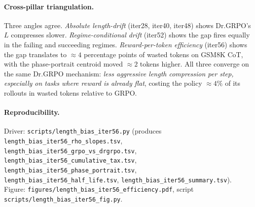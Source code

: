 \paragraph{Cross-pillar triangulation.}
Three angles agree. \emph{Absolute length-drift} (iter28, iter40, iter48)
shows Dr.GRPO's $L$ compresses slower. \emph{Regime-conditional drift}
(iter52) shows the gap fires equally in the failing and succeeding
regimes. \emph{Reward-per-token efficiency} (iter56) shows the gap
translates to $\approx 4$ percentage points of wasted tokens on GSM8K
CoT, with the phase-portrait centroid moved $\approx 2$ tokens higher.
All three converge on the same Dr.GRPO mechanism: \emph{less aggressive
length compression per step, especially on tasks where reward is
already flat}, costing the policy $\approx 4\%$ of its rollouts in
wasted tokens relative to GRPO.

\paragraph{Reproducibility.}
Driver: \texttt{scripts/length\_bias\_iter56.py} (produces
\texttt{length\_bias\_iter56\_rho\_slopes.tsv},
\texttt{length\_bias\_iter56\_grpo\_vs\_drgrpo.tsv},
\texttt{length\_bias\_iter56\_cumulative\_tax.tsv},
\texttt{length\_bias\_iter56\_phase\_portrait.tsv},
\texttt{length\_bias\_iter56\_half\_life.tsv},
\texttt{length\_bias\_iter56\_summary.tsv}).
Figure: \texttt{figures/length\_bias\_iter56\_efficiency.pdf},
script \texttt{scripts/length\_bias\_iter56\_fig.py}.
